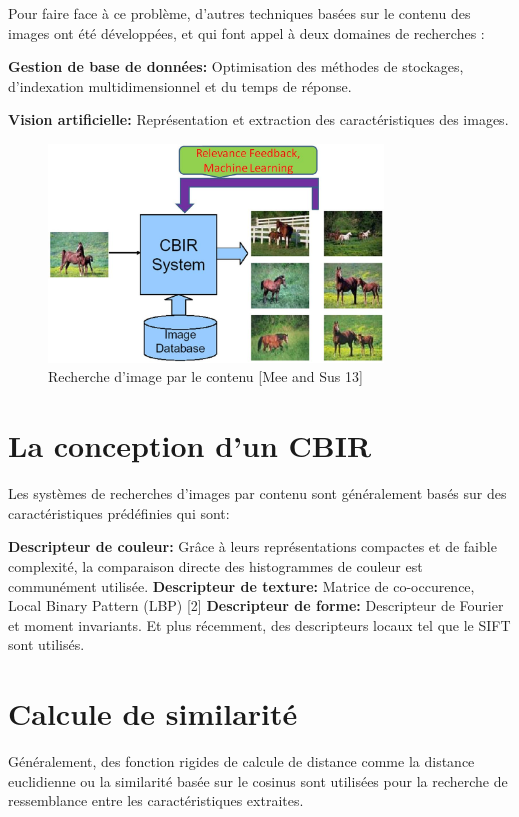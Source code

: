 	Pour faire face à ce problème, d'autres techniques basées sur le contenu des images ont été développées, et qui font appel à deux domaines de recherches :

\textbf{Gestion de base de données:} Optimisation des méthodes de stockages, d'indexation multidimensionnel et du temps de réponse.

\textbf{Vision artificielle:} Représentation et extraction des caractéristiques des images.


\begin{figure}[H]
	\centering
		\includegraphics[width=3.5in]{Figures/cbir.JPG}
	\caption[An Electron]{Recherche d'image par le contenu [Mee and Sus 13]}
	\label{fig:Electron}
\end{figure}


\section{La conception d'un CBIR}

Les systèmes de recherches d'images par contenu sont généralement basés sur des caractéristiques prédéfinies qui sont:

\textbf{Descripteur  de couleur:} Grâce à  leurs représentations compactes et de faible complexité, la comparaison directe des histogrammes de couleur est communément utilisée.
\textbf{Descripteur de texture:} Matrice de co-occurence, Local Binary Pattern (LBP) [2]
\textbf{Descripteur de forme:} Descripteur de Fourier et moment invariants.
Et plus récemment, des descripteurs locaux tel que le SIFT sont utilisés.

\section{Calcule de similarité}
	Généralement, des fonction rigides de calcule de distance comme la distance euclidienne ou la similarité basée sur le cosinus sont utilisées pour la recherche de ressemblance entre les caractéristiques extraites.

